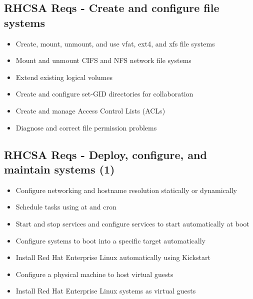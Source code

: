 \documentclass[letterpaper,10pt,english]{sphinxmanual}
\begin{document}
\subsection{RHCSA Reqs - Create and configure file systems}
\label{intro:rhcsa-reqs-create-and-configure-file-systems}\begin{itemize}
\item {} 
Create, mount, unmount, and use vfat, ext4, and xfs file systems

\item {} 
Mount and unmount CIFS and NFS network file systems

\item {} 
Extend existing logical volumes

\item {} 
Create and configure set-GID directories for collaboration

\item {} 
Create and manage Access Control Lists (ACLs)

\item {} 
Diagnose and correct file permission problems

\end{itemize}


\subsection{RHCSA Reqs - Deploy, configure, and maintain systems (1)}
\label{intro:rhcsa-reqs-deploy-configure-and-maintain-systems-1}\begin{itemize}
\item {} 
Configure networking and hostname resolution statically or dynamically

\item {} 
Schedule tasks using at and cron

\item {} 
Start and stop services and configure services to start automatically at boot

\item {} 
Configure systems to boot into a specific target automatically

\item {} 
Install Red Hat Enterprise Linux automatically using Kickstart

\item {} 
Configure a physical machine to host virtual guests

\item {} 
Install Red Hat Enterprise Linux systems as virtual guests

\end{itemize}
\end{document}
